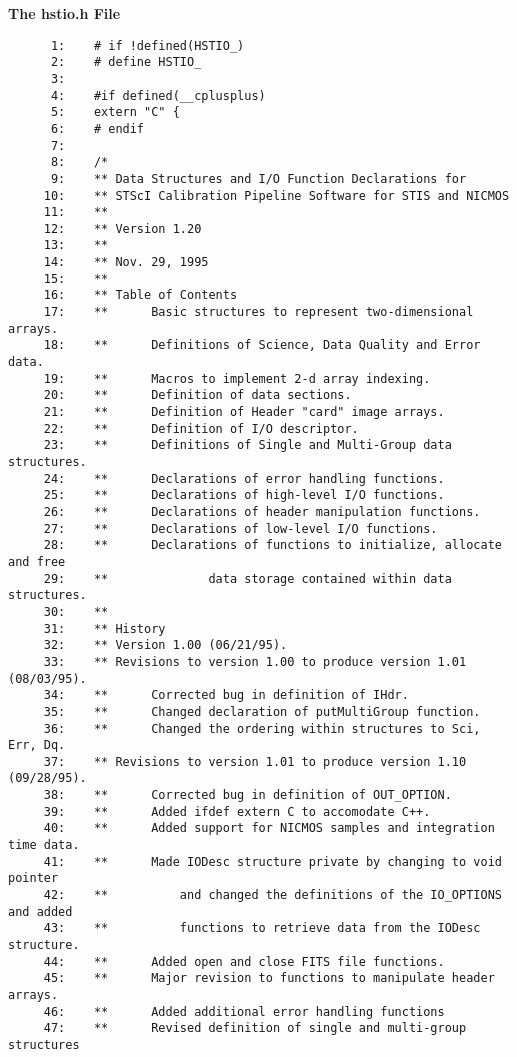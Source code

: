 \hspace{0.5in} {\bf The hstio.h File}
\begin{scriptsize}
\begin{verbatim}
      1:    # if !defined(HSTIO_)
      2:    # define HSTIO_
      3:    
      4:    #if defined(__cplusplus)
      5:    extern "C" {
      6:    # endif 
      7:    
      8:    /*
      9:    ** Data Structures and I/O Function Declarations for
     10:    ** STScI Calibration Pipeline Software for STIS and NICMOS
     11:    **
     12:    ** Version 1.20
     13:    **
     14:    ** Nov. 29, 1995
     15:    **
     16:    ** Table of Contents
     17:    **      Basic structures to represent two-dimensional arrays.
     18:    **      Definitions of Science, Data Quality and Error data.
     19:    **      Macros to implement 2-d array indexing.
     20:    **      Definition of data sections.
     21:    **      Definition of Header "card" image arrays.
     22:    **      Definition of I/O descriptor.
     23:    **      Definitions of Single and Multi-Group data structures.
     24:    **      Declarations of error handling functions.
     25:    **      Declarations of high-level I/O functions.
     26:    **      Declarations of header manipulation functions.
     27:    **      Declarations of low-level I/O functions.
     28:    **      Declarations of functions to initialize, allocate and free
     29:    **              data storage contained within data structures.
     30:    **
     31:    ** History
     32:    ** Version 1.00 (06/21/95).
     33:    ** Revisions to version 1.00 to produce version 1.01 (08/03/95).
     34:    **      Corrected bug in definition of IHdr.
     35:    **      Changed declaration of putMultiGroup function.
     36:    **      Changed the ordering within structures to Sci, Err, Dq.
     37:    ** Revisions to version 1.01 to produce version 1.10 (09/28/95).
     38:    **      Corrected bug in definition of OUT_OPTION.
     39:    **      Added ifdef extern C to accomodate C++.
     40:    **      Added support for NICMOS samples and integration time data.
     41:    **      Made IODesc structure private by changing to void pointer
     42:    **          and changed the definitions of the IO_OPTIONS and added 
     43:    **          functions to retrieve data from the IODesc structure.
     44:    **      Added open and close FITS file functions.
     45:    **      Major revision to functions to manipulate header arrays.
     46:    **      Added additional error handling functions
     47:    **      Revised definition of single and multi-group structures

\end{verbatim}
\end{scriptsize}
